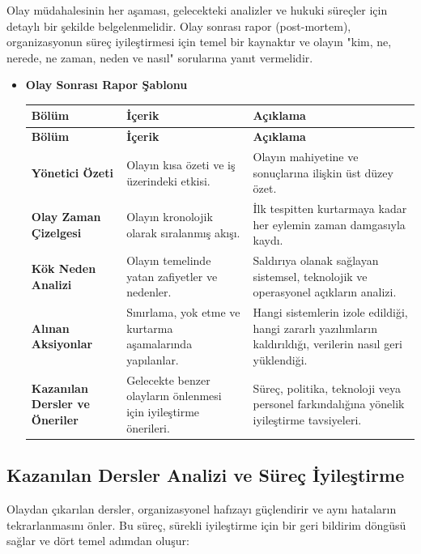 \begin{itemize}
\begin{itemize}
Olay müdahalesinin her aşaması, gelecekteki analizler ve hukuki süreçler için detaylı bir şekilde belgelenmelidir. Olay sonrası rapor (post-mortem), organizasyonun süreç iyileştirmesi için temel bir kaynaktır ve olayın "kim, ne, nerede, ne zaman, neden ve nasıl" sorularına yanıt vermelidir.

\begin{itemize}
    \item \textbf{Olay Sonrası Rapor Şablonu}
    
    \begin{longtable}{|L{3cm}|L{4cm}|L{5.5cm}|}
    \hline
    \textbf{Bölüm} & \textbf{İçerik} & \textbf{Açıklama} \\
    \hline
    \endfirsthead
    \hline
    \textbf{Bölüm} & \textbf{İçerik} & \textbf{Açıklama} \\
    \hline
    \endhead
    \textbf{Yönetici Özeti} & Olayın kısa özeti ve iş üzerindeki etkisi. & Olayın mahiyetine ve sonuçlarına ilişkin üst düzey özet. \\
    \hline
    \textbf{Olay Zaman Çizelgesi} & Olayın kronolojik olarak sıralanmış akışı. & İlk tespitten kurtarmaya kadar her eylemin zaman damgasıyla kaydı. \\
    \hline
    \textbf{Kök Neden Analizi} & Olayın temelinde yatan zafiyetler ve nedenler. & Saldırıya olanak sağlayan sistemsel, teknolojik ve operasyonel açıkların analizi. \\
    \hline
    \textbf{Alınan Aksiyonlar} & Sınırlama, yok etme ve kurtarma aşamalarında yapılanlar. & Hangi sistemlerin izole edildiği, hangi zararlı yazılımların kaldırıldığı, verilerin nasıl geri yüklendiği. \\
    \hline
    \textbf{Kazanılan Dersler ve Öneriler} & Gelecekte benzer olayların önlenmesi için iyileştirme önerileri. & Süreç, politika, teknoloji veya personel farkındalığına yönelik iyileştirme tavsiyeleri. \\
    \hline
    \end{longtable}
\end{itemize}

\subsection{Kazanılan Dersler Analizi ve Süreç İyileştirme}

Olaydan çıkarılan dersler, organizasyonel hafızayı güçlendirir ve aynı hataların tekrarlanmasını önler. Bu süreç, sürekli iyileştirme için bir geri bildirim döngüsü sağlar ve dört temel adımdan oluşur:


\end{itemize}
\end{itemize}
